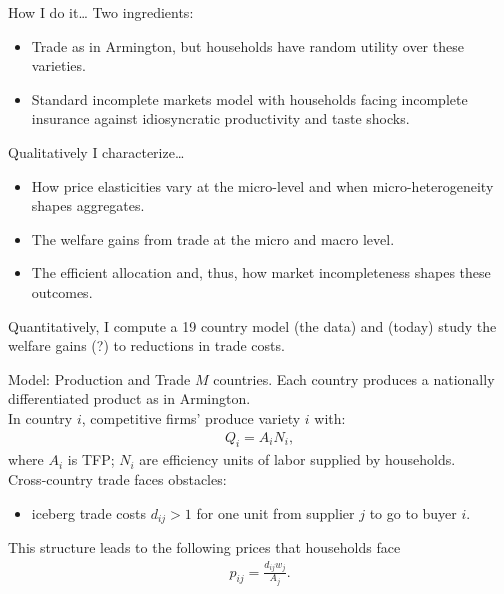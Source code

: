 \documentclass[9pt,pdftex,aspectratio=1610]{beamer}
\theoremstyle{definition}
\begin{document}
\begin{frame}[t]{How I do it\ldots}
Two ingredients:
\begin{itemize}
\smallskip
\item Trade as in Armington, but households have random utility over these varieties.
\smallskip
\item Standard incomplete markets model with households facing incomplete insurance against idiosyncratic productivity and taste shocks.
\end{itemize}
\bigskip
Qualitatively I characterize\ldots
\begin{itemize}
\smallskip
\item How price elasticities vary at the micro-level and when micro-heterogeneity shapes aggregates.
\smallskip
\item The welfare gains from trade at the micro and macro level.
\smallskip
\item The efficient allocation and, thus, how market incompleteness shapes these outcomes.
\end{itemize}
\bigskip
Quantitatively, I compute a 19 country model (the \citet{eaton2002technology} data) and (today) study the welfare gains (?) to reductions in trade costs.
\end{frame}


\begin{frame}[t]{Model: Production and Trade}
\smallskip
$M$ countries. Each country produces a nationally differentiated product as in Armington.\\
\bigskip
\medskip
In country $i$, competitive firms' produce variety $i$ with:
\begin{align*}
Q_i = A_i N_i,
\end{align*}
where $A_i$ is TFP; $N_i$ are efficiency units of labor supplied by households.\\
\bigskip
\medskip
Cross-country trade faces obstacles:
\begin{itemize}
\smallskip
\item iceberg trade costs $d_{ij} > 1$ for one unit from supplier $j$ to go to buyer $i$.
\end{itemize}
\bigskip
\medskip
This structure leads to the following prices that households face
\begin{align*}
p_{ij} = \frac{d_{ij}w_{j}}{A_{j}}.
\end{align*}
\end{frame}
\end{document}
